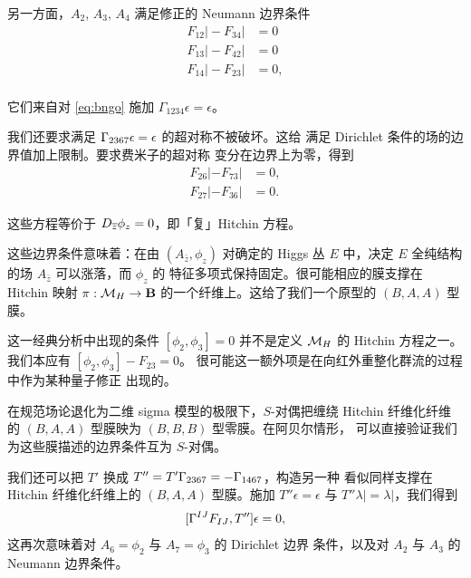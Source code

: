 另一方面，$A_{2}$, $A_{3}$, $A_{4}$ 满足修正的 Neumann 边界条件 %
\setcounter{equation}{24}
\begin{equation}\label{eq:yimgo}
\begin{aligned} F_{12}\vert -
F_{34}\vert
 &=0\\
 F_{13}\vert - F_{42}\vert
 &=0\\
 F_{14}\vert - F_{23}\vert
 &=0,\\\end{aligned}
\end{equation}

它们来自对 \eqref{eq:bngo} 施加 $\Gamma_{1234}\epsilon=\epsilon$。

我们还要求满足 $\Gamma_{2367}\epsilon=\epsilon$ 的超对称不被破坏。这给
满足 Dirichlet 条件的场的边界值加上限制。要求费米子的超对称
变分在边界上为零，得到
\setcounter{equation}{25}
\begin{equation}\label{eq:dirbaa}
\begin{aligned}F_{26}|-F_{73}|&=0,\\ F_{27}|-F_{36}|&=0.\end{aligned}
\end{equation}

这些方程等价于 $D_{\overline z}\phi_z=0$，即「复」Hitchin 方程。

这些边界条件意味着：在由 $(A_{\bar z},\phi_z)$ 对确定的 Higgs 丛
$E$ 中，决定 $E$ 全纯结构的场 $A_{\bar z}$ 可以涨落，而 $\phi_z$ 的
特征多项式保持固定。很可能相应的膜支撑在 Hitchin 映射
$\pi:{{{\mathcal{M}}}_H}\to {{\mathbf{B}}}$ 的一个纤维上。这给了我们一个原型的
$(B,A,A)$ 型膜。

这一经典分析中出现的条件 $[\phi_2,\phi_3]=0$ 并不是定义 ${{{\mathcal{M}}}_H}$
的 Hitchin 方程之一。我们本应有 $[\phi_2,\phi_3]-F_{23}=0$。
很可能这一额外项是在向红外重整化群流的过程中作为某种量子修正
出现的。

在规范场论退化为二维 sigma 模型的极限下，$S$-对偶把缠绕 Hitchin
纤维化纤维的 $(B,A,A)$ 型膜映为 $(B,B,B)$ 型零膜。在阿贝尔情形，
可以直接验证我们为这些膜描述的边界条件互为 $S$-对偶。

我们还可以把 $T'$ 换成 $T''=T'{\Gamma}_{2367}=-{\Gamma}_{1467}$，构造另一种
看似同样支撑在 Hitchin 纤维化纤维上的 $(B,A,A)$ 型膜。施加
$T''\epsilon=\epsilon$ 与 $T''\lambda\vert=\lambda\vert$，我们得到
\setcounter{equation}{26}
\begin{equation}\label{eq:loppo}
[{\Gamma}^{IJ}F_{IJ},T'']\epsilon=0,
\end{equation}
 这再次意味着对 $A_6=\phi_2$ 与 $A_7=\phi_3$ 的 Dirichlet 边界
条件，以及对 $A_2$ 与 $A_3$ 的 Neumann 边界条件。


